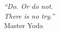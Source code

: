 \cleardoublepage
\thispagestyle{plain}

\vspace*{8cm}

\begin{flushright}
   \textsl{``Do. Or do not.\\ There is no try.''} \\
\vspace*{1.5cm}
           Master Yoda
\end{flushright}
